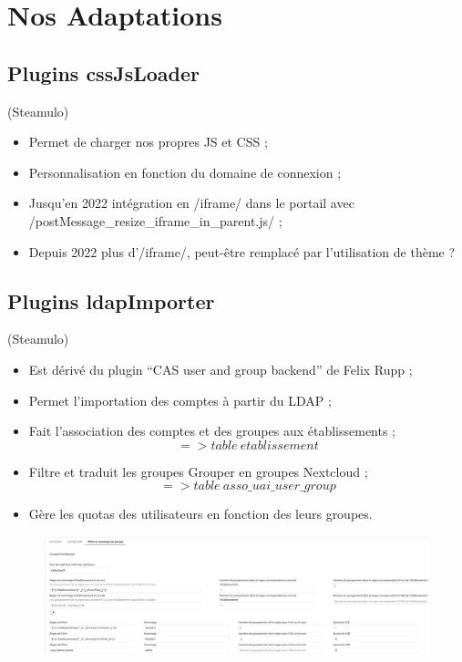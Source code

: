 \section{Nos Adaptations}
\subsection{Plugins cssJsLoader}
\begin{frame}[fragile]{\sub}{(Steamulo)}
\begin{itemize}
\item Permet de charger nos propres JS et CSS ;
\item Personnalisation en fonction du domaine de connexion ;
\item Jusqu'en 2022 intégration en \code/iframe/ dans le portail avec \code/postMessage_resize_iframe_in_parent.js/ ;
\item Depuis 2022 plus d'\code/iframe/, peut-être remplacé par l'utilisation de thème ? 
\end{itemize}
\end{frame} 

\subsection{Plugins ldapImporter}
\begin{frame}{\sub}{(Steamulo)} %
\begin{itemize}
\item Est dérivé du plugin ``CAS user and group backend'' de Felix Rupp ;
\item Permet l'importation des comptes à partir du LDAP ;
\item Fait l'association des comptes et des groupes aux établissements ;
		{\small $$ => table\ etablissement $$} 
\item Filtre et traduit les groupes Grouper en groupes Nextcloud ;
		{\small $$ => table\ asso\_uai\_user\_group $$ } 
\item Gère les quotas des utilisateurs en fonction des leurs groupes.
\end{itemize}
\end{frame}


\begin{frame}{\sub} %
\begin{figure}
\includegraphics[width=\textwidth, height=0.85\textheight]{ldapimporter.png}
\end{figure}
\end{frame}

